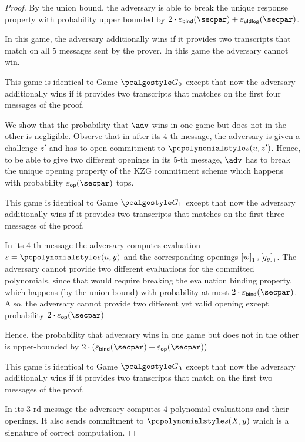 \begin{proof}
  By the union bound, the adversary is able to break the unique response property with probability upper bounded by $2 \cdot \epsbinding (\secpar) + \epsuldlog (\secpar)$.
\iffalse

   In this game, the adversary additionally wins if it provides two transcripts that match on all $5$ messages sent by the prover.
  In this game the adversary cannot win.

   This game is identical to Game $\game{0}$ except that now the
  adversary additionally wins if it provides two transcripts that matches on the first four
  messages of the proof.

   We show that the probability that $\adv$
  wins in one game but does not in the other is negligible.  Observe that in
  after its $4$-th message, the adversary is given a challenge $z'$ and has to open
  commitment to $\p{s} (u, z')$. Hence, to be able to give two different
  openings in its $5$-th message, $\adv$ has to break the unique opening property of the
  KZG commitment scheme which happens with probability $\epsop (\secpar)$ tops.

   This game is identical to Game $\game{1}$ except that now the
  adversary additionally wins if it provides two transcripts that matches on the
  first three messages of the proof.

   In its $4$-th message the adversary computes evaluation
  $s = \p{s} (u, y)$ and the corresponding openings $\left[w\right]_{1}, \left[q_y\right]_{1}$. The adversary
  cannot provide two different evaluations for the committed polynomials, since that would
  require breaking the evaluation binding property, which happens (by the union bound)
  with probability at most $2 \cdot \epsbind (\secpar)$. Also, the adversary cannot provide two
  different yet valid opening except probability $2 \cdot \epsop (\secpar)$

  Hence, the probability that adversary wins in one game but does not in the
  other is upper-bounded by $2 \cdot (\epsbind (\secpar) + \epsop (\secpar))$

   This game is identical to Game $\game{3}$ except that now the
  adversary additionally wins if it provides two transcripts that match on the
  first two messages of the proof.

   In its $3$-rd message the adversary computes $4$ polynomial
  evaluations and their openings. It also sends commitment to $\p{s} (X, y)$ which is a
  signature of correct computation.


\end{proof}

